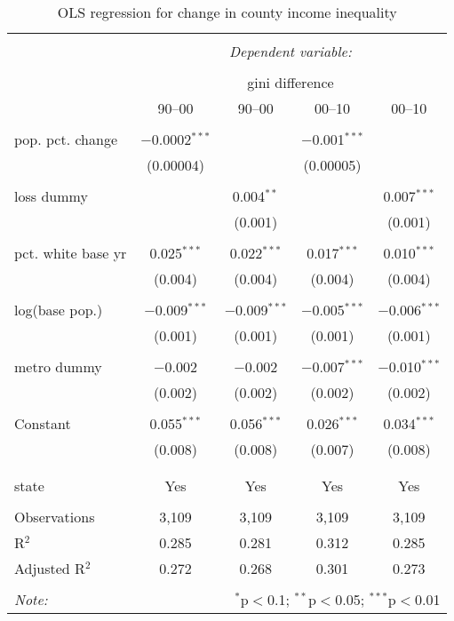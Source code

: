 
\begin{table}[p] \centering 
  \caption{OLS regression for change in county income inequality} 
  \label{} 
\begin{tabular}{@{\extracolsep{5pt}}lcccc} 
\\[-1.8ex]\hline 
\hline \\[-1.8ex] 
 & \multicolumn{4}{c}{\textit{Dependent variable:}} \\ 
\cline{2-5} 
\\[-1.8ex] & \multicolumn{4}{c}{gini difference} \\ 
 & 90--00 & 90--00 & 00--10 & 00--10 \\ 
\hline \\[-1.8ex] 
 pop. pct. change & $-$0.0002$^{***}$ &  & $-$0.001$^{***}$ &  \\ 
  & (0.00004) &  & (0.00005) &  \\ 
  & & & & \\ 
 loss dummy &  & 0.004$^{**}$ &  & 0.007$^{***}$ \\ 
  &  & (0.001) &  & (0.001) \\ 
  & & & & \\ 
 pct. white base yr & 0.025$^{***}$ & 0.022$^{***}$ & 0.017$^{***}$ & 0.010$^{***}$ \\ 
  & (0.004) & (0.004) & (0.004) & (0.004) \\ 
  & & & & \\ 
 log(base pop.) & $-$0.009$^{***}$ & $-$0.009$^{***}$ & $-$0.005$^{***}$ & $-$0.006$^{***}$ \\ 
  & (0.001) & (0.001) & (0.001) & (0.001) \\ 
  & & & & \\ 
 metro dummy & $-$0.002 & $-$0.002 & $-$0.007$^{***}$ & $-$0.010$^{***}$ \\ 
  & (0.002) & (0.002) & (0.002) & (0.002) \\ 
  & & & & \\ 
 Constant & 0.055$^{***}$ & 0.056$^{***}$ & 0.026$^{***}$ & 0.034$^{***}$ \\ 
  & (0.008) & (0.008) & (0.007) & (0.008) \\ 
  & & & & \\ 
\hline \\[-1.8ex] 
state & Yes & Yes & Yes & Yes \\ 
\hline \\[-1.8ex] 
Observations & 3,109 & 3,109 & 3,109 & 3,109 \\ 
R$^{2}$ & 0.285 & 0.281 & 0.312 & 0.285 \\ 
Adjusted R$^{2}$ & 0.272 & 0.268 & 0.301 & 0.273 \\ 
\hline 
\hline \\[-1.8ex] 
\textit{Note:}  & \multicolumn{4}{r}{$^{*}$p$<$0.1; $^{**}$p$<$0.05; $^{***}$p$<$0.01} \\ 
\end{tabular} 
\end{table} 
